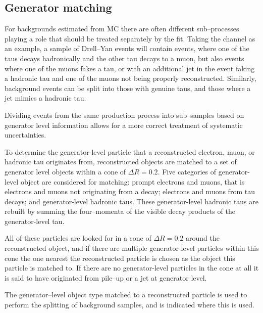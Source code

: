 \subsection{Generator matching}
\label{sec:mssm_bkgs_genmatch}
For backgrounds estimated from \ac{MC} there are often 
different sub--processes playing a role that should be
treated separately by the fit. Taking the \mutau 
channel as an example, a sample of Drell--Yan events
will contain \Ztautau events, where one of the taus decays
hadronically and the other tau decays to a muon, but also
\Zmm events where one of the muons fakes a tau, or with an 
additional jet in the event faking a hadronic tau and one of the
muons not being properly reconstructed. Similarly, \ttbar background
events can be split into those with genuine taus, and those
where a jet mimics a hadronic tau.

Dividing events from the same production
process into sub--samples
based on generator level information allows
for a more correct treatment of systematic uncertainties. 

To determine the generator-level particle
that a reconstructed electron, muon, or hadronic tau
originates from, reconstructed objects are matched
to a set of generator level objects within a cone of $\Delta R = 0.2$.
Five categories of generator-level object are considered for matching:
prompt electrons and muons,
that is electrons and muons not originating from a decay; electrons and muons
from tau decays; and generator-level hadronic taus. These generator-level
hadronic taus are rebuilt by summing the four--momenta
of the visible decay products of the generator-level tau.

All of these particles are looked for in a cone of $\Delta R = 0.2$ around
the reconstructed object, and if there are multiple generator-level
particles within this cone the one nearest the reconstructed particle
is chosen as the object this particle is matched to. If there are no 
generator-level particles in the cone at all it is said to 
have originated from pile--up or a jet at generator level.

The generator--level object type matched to a 
reconstructed particle is used to perform the splitting
of background samples, and is indicated where this is used.


